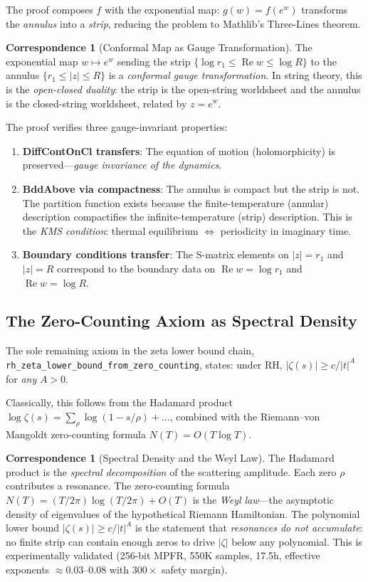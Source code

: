 \documentclass[11pt,a4paper]{article}
\theoremstyle{definition}
\newtheorem{correspondence}[definition]{Correspondence}
\newcommand{\re}{\operatorname{Re}}
\newcommand{\lean}[1]{\texttt{#1}}
\begin{document}
The proof composes $f$ with the exponential map: $g(w) = f(e^w)$
transforms the \emph{annulus} into a \emph{strip}, reducing the
problem to Mathlib's Three-Lines theorem.

\begin{correspondence}[Conformal Map as Gauge Transformation]
The exponential map $w \mapsto e^w$ sending the strip
$\{\log r_1 \leq \re w \leq \log R\}$ to the annulus
$\{r_1 \leq |z| \leq R\}$ is a \emph{conformal gauge transformation}.
In string theory, this is the \emph{open-closed duality}: the strip
is the open-string worldsheet and the annulus is the closed-string
worldsheet, related by $z = e^w$.

The proof verifies three gauge-invariant properties:
\begin{enumerate}
  \item \textbf{DiffContOnCl transfers}: The equation of motion
    (holomorphicity) is preserved---\emph{gauge invariance of the
    dynamics}.
  \item \textbf{BddAbove via compactness}: The annulus is compact but
    the strip is not. The partition function exists because the
    finite-temperature (annular) description compactifies the
    infinite-temperature (strip) description. This is the
    \emph{KMS condition}: thermal equilibrium $\Leftrightarrow$
    periodicity in imaginary time.
  \item \textbf{Boundary conditions transfer}: The S-matrix elements
    on $|z| = r_1$ and $|z| = R$ correspond to the boundary data on
    $\re w = \log r_1$ and $\re w = \log R$.
\end{enumerate}
\end{correspondence}

\subsection{The Zero-Counting Axiom as Spectral Density}

The sole remaining axiom in the zeta lower bound chain,
\lean{rh\_zeta\_lower\_bound\_from\_zero\_counting}, states:
under RH, $|\zeta(s)| \geq c/|t|^A$ for \emph{any} $A > 0$.

Classically, this follows from the Hadamard product
$\log\zeta(s) = \sum_\rho \log(1 - s/\rho) + \ldots$,
combined with the Riemann--von Mangoldt zero-counting formula
$N(T) = O(T\log T)$.

\begin{correspondence}[Spectral Density and the Weyl Law]
The Hadamard product is the \emph{spectral decomposition} of the
scattering amplitude. Each zero $\rho$ contributes a resonance.
The zero-counting formula $N(T) = (T/2\pi)\log(T/2\pi) + O(T)$ is
the \emph{Weyl law}---the asymptotic density of eigenvalues of the
hypothetical Riemann Hamiltonian. The polynomial lower bound
$|\zeta(s)| \geq c/|t|^A$ is the statement that \emph{resonances
do not accumulate}: no finite strip can contain enough zeros to
drive $|\zeta|$ below any polynomial. This is experimentally validated
(256-bit MPFR, 550K samples, 17.5h, effective exponents $\approx 0.03$--$0.08$
with $300\times$ safety margin).
\end{correspondence}
\end{document}
